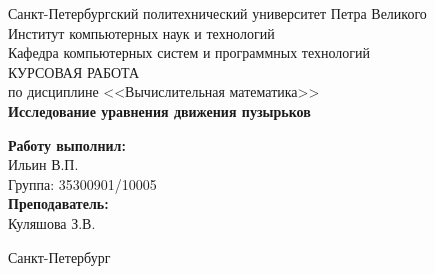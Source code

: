 \begin{titlepage}
		\begin{center}
			\large Санкт-Петербургский политехнический университет Петра Великого\\
			\large Институт компьютерных наук и технологий \\
			\large Кафедра компьютерных систем и программных технологий\\[6cm]


		\huge КУРСОВАЯ РАБОТА\\[0.5cm]
			\large по дисциплине <<Вычислительная математика>>\\[0.1cm]
			\large\textbf{Исследование уравнения движения пузырьков}\\[5cm]
		\end{center}


		\begin{flushright}
			\begin{minipage}{0.25\textwidth}
				\begin{flushleft}

					\large\textbf{Работу выполнил:}\\
					\large Ильин В.П.\\
					\large {Группа:} 35300901/10005\\

					\large \textbf{Преподаватель:}\\
					\large Куляшова З.В.

				\end{flushleft}
			\end{minipage}
		\end{flushright}

		\vfill

		\begin{center}
			\large Санкт-Петербург\\
			\large \the\year
		\end{center}
	\end{titlepage}

	\vfill
	\newpage
